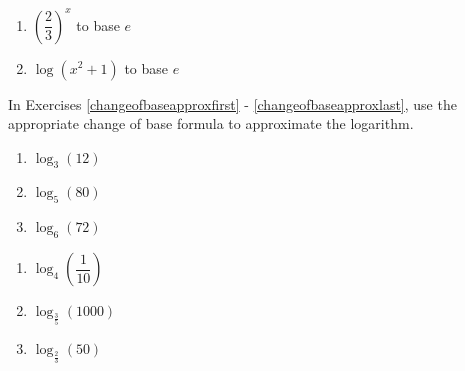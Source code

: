\begin{multicols}{2}
\begin{enumerate}
\setcounter{enumi}{\value{HW}}

\item $\left(\dfrac{2}{3}\right)^{x}$ to base $e$
\item $\log(x^{2} + 1)$ to base $e$ \label{changeofbaselast}

\setcounter{HW}{\value{enumi}}
\end{enumerate}
\end{multicols}

In Exercises \ref{changeofbaseapproxfirst} - \ref{changeofbaseapproxlast}, use the appropriate change of base formula to approximate the logarithm.

\begin{multicols}{3}
\begin{enumerate}
\setcounter{enumi}{\value{HW}}

\item $\log_{3}(12)$ \label{changeofbaseapproxfirst}
\item $\log_{5}(80)$
\item $\log_{6}(72)$

\setcounter{HW}{\value{enumi}}
\end{enumerate}
\end{multicols}

\begin{multicols}{3}
\begin{enumerate}
\setcounter{enumi}{\value{HW}}

\item $\log_{4}\left(\dfrac{1}{10}\right)$
\item $\log_{\frac{3}{5}}(1000)$ 
\item $\log_{\frac{2}{3}}(50)$  \label{changeofbaseapproxlast}

\setcounter{HW}{\value{enumi}}
\end{enumerate}
\end{multicols}

